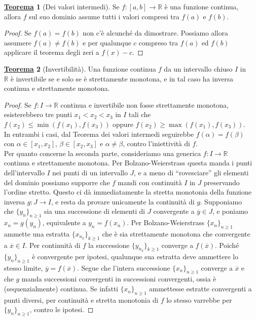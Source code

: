 \documentclass[a4paper,twoside]{article}
\newcommand{\R}{\mathbb{R}}
\theoremstyle{definition}
\newtheorem{theorem}{\color{Red}\underline{\textrm Teorema}}
\numberwithin{theorem}{section}
\begin{document}
\begin{theorem}[Dei valori intermedi]
Se $f:[a,b]\to \R$ è una funzione continua, allora $f$ sul suo dominio assume tutti i valori compresi tra $f(a)$ e $f(b)$.
\end{theorem}
\begin{proof}
Se $f(a)=f(b)$ non c'è alcunché da dimostrare. Possiamo allora assumere $f(a)\neq f(b)$ e per qualunque $c$ compreso tra $f(a)$ ed $f(b)$ applicare il teorema degli zeri a $f(x)-c$. 
\end{proof}


\begin{theorem}[Invertibilità]
Una funzione continua $f$ da un intervallo chiuso $I$ in $\R$ è invertibile se e solo se è strettamente monotona, e in tal caso ha inversa continua e strettamente monotona. 
\end{theorem}
\begin{proof}

Se $f:I\to \R$ continua e invertibile non fosse strettamente monotona, esisterebbero tre punti ${x_1<x_2<x_3}$ in $I$ tali che $f(x_2)\leq \min(f(x_1),f(x_3))$ oppure $f(x_2)\geq \max(f(x_1),f(x_3))$. In entrambi i casi, dal Teorema dei valori intermedi seguirebbe $f(\alpha)=f(\beta)$ con $\alpha\in[x_1,x_2]$, $\beta\in[x_2,x_3]$ e $\alpha\neq\beta$, contro l'iniettività di $f$.\\
Per quanto concerne la seconda parte, consideriamo una generica $f:I\to\mathbb{R}$ continua e strettamente monotona. Per Bolzano-Weierstrass questa manda i punti dell'intervallo $I$ nei punti di un intervallo $J$, e a meno di ``rovesciare'' gli elementi del dominio possiamo supporre che $f$ mandi con continuità $I$ in $J$ preservando l'ordine stretto. Questo ci dà immediatamente la stretta monotonia della funzione inversa $g:J\to I$, e resta da provare unicamente la continuità di $g$. Supponiamo che $\{y_n\}_{n\geq 1}$ sia una successione di elementi di $J$ convergente a $\overline{y}\in J$, e poniamo $x_n=g(y_n)$, equivalente a $y_n=f(x_n)$. Per Bolzano-Weierstrass $\{x_n\}_{n\geq 1}$ ammette una estratta $\{x_{n_k}\}_{k\geq 1}$ che è sia strettamente monotona che convergente a $\overline{x}\in I$. Per continuità di $f$ la successione $\{y_{n_k}\}_{k\geq 1}$ converge a $f(\overline{x})$. Poiché $\{y_n\}_{n\geq 1}$ è convergente per ipotesi, qualunque sua estratta deve ammettere lo stesso limite, $\overline{y}=f(\overline{x})$. Segue che l'intera successione $\{x_n\}_{n\geq 1}$ converge a $\overline{x}$ e che $g$ manda successioni convergenti in successioni convergenti, ossia è (sequenzialmente) continua. Se infatti $\{x_n\}_{n\geq 1}$ ammettesse estratte convergenti a punti diversi, per continuità e stretta monotonia di $f$ lo stesso varrebbe per $\{y_n\}_{n\geq 1}$, contro le ipotesi.
\end{proof}
\end{document}
